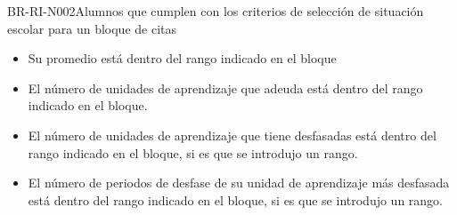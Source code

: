 \begin{BusinessRule}{BR-RI-N002}{Alumnos que cumplen con los criterios de selección de situación escolar para un bloque de citas}
\begin{itemize}
 		\item Su promedio está dentro del rango indicado en el bloque
 		\item El número de unidades de aprendizaje que adeuda está dentro del rango indicado en el bloque.
 		\item El número de unidades de aprendizaje que tiene desfasadas está dentro del rango indicado en el bloque, si es que se introdujo un rango.
 		\item El número de periodos de desfase de su unidad de aprendizaje más desfasada está dentro del rango indicado en el bloque, si es que se introdujo un rango.
	\end{itemize}
	
	
	
%					 
%					
%			

\end{BusinessRule}
